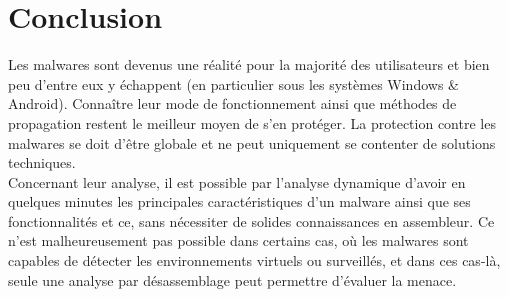 \section{Conclusion}

Les malwares sont devenus une réalité pour la majorité des utilisateurs et bien peu d'entre eux y échappent (en particulier sous les systèmes Windows \& Android). Connaître leur mode de fonctionnement ainsi que méthodes de propagation restent le meilleur moyen de s'en protéger. La protection contre les malwares se doit d'être globale et ne peut uniquement se contenter de solutions techniques.\\

Concernant leur analyse, il est possible par l'analyse dynamique d'avoir en quelques minutes les principales caractéristiques d'un malware ainsi que ses fonctionnalités et ce, sans nécessiter de solides connaissances en assembleur. Ce n'est malheureusement pas possible dans certains cas, où les malwares sont capables de détecter les environnements virtuels ou surveillés, et dans ces cas-là, seule une analyse par désassemblage peut permettre d'évaluer la menace.\\


